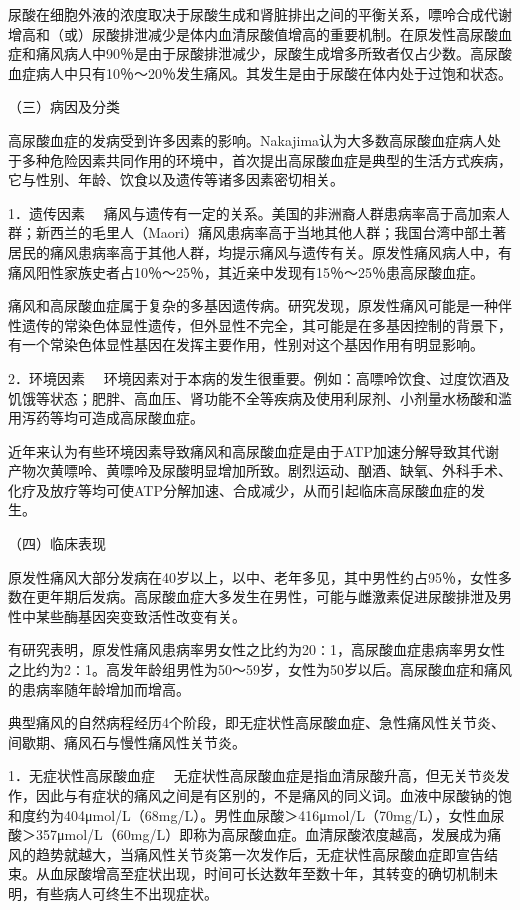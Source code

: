 尿酸在细胞外液的浓度取决于尿酸生成和肾脏排出之间的平衡关系，嘌呤合成代谢增高和（或）尿酸排泄减少是体内血清尿酸值增高的重要机制。在原发性高尿酸血症和痛风病人中90％是由于尿酸排泄减少，尿酸生成增多所致者仅占少数。高尿酸血症病人中只有10％～20％发生痛风。其发生是由于尿酸在体内处于过饱和状态。

（三）病因及分类

高尿酸血症的发病受到许多因素的影响。Nakajima认为大多数高尿酸血症病人处于多种危险因素共同作用的环境中，首次提出高尿酸血症是典型的生活方式疾病，它与性别、年龄、饮食以及遗传等诸多因素密切相关。

{1．遗传因素}
　痛风与遗传有一定的关系。美国的非洲裔人群患病率高于高加索人群；新西兰的毛里人（Maori）痛风患病率高于当地其他人群；我国台湾中部土著居民的痛风患病率高于其他人群，均提示痛风与遗传有关。原发性痛风病人中，有痛风阳性家族史者占10％～25％，其近亲中发现有15％～25％患高尿酸血症。

痛风和高尿酸血症属于复杂的多基因遗传病。研究发现，原发性痛风可能是一种伴性遗传的常染色体显性遗传，但外显性不完全，其可能是在多基因控制的背景下，有一个常染色体显性基因在发挥主要作用，性别对这个基因作用有明显影响。

{2．环境因素}
　环境因素对于本病的发生很重要。例如：高嘌呤饮食、过度饮酒及饥饿等状态；肥胖、高血压、肾功能不全等疾病及使用利尿剂、小剂量水杨酸和滥用泻药等均可造成高尿酸血症。

近年来认为有些环境因素导致痛风和高尿酸血症是由于ATP加速分解导致其代谢产物次黄嘌呤、黄嘌呤及尿酸明显增加所致。剧烈运动、酗酒、缺氧、外科手术、化疗及放疗等均可使ATP分解加速、合成减少，从而引起临床高尿酸血症的发生。

（四）临床表现

原发性痛风大部分发病在40岁以上，以中、老年多见，其中男性约占95％，女性多数在更年期后发病。高尿酸血症大多发生在男性，可能与雌激素促进尿酸排泄及男性中某些酶基因突变致活性改变有关。

有研究表明，原发性痛风患病率男女性之比约为20∶1，高尿酸血症患病率男女性之比约为2∶1。高发年龄组男性为50～59岁，女性为50岁以后。高尿酸血症和痛风的患病率随年龄增加而增高。

典型痛风的自然病程经历4个阶段，即无症状性高尿酸血症、急性痛风性关节炎、间歇期、痛风石与慢性痛风性关节炎。

{1．无症状性高尿酸血症}
　无症状性高尿酸血症是指血清尿酸升高，但无关节炎发作，因此与有症状的痛风之间是有区别的，不是痛风的同义词。血液中尿酸钠的饱和度约为404μmol/L（68mg/L）。男性血尿酸＞416μmol/L（70mg/L），女性血尿酸＞357μmol/L（60mg/L）即称为高尿酸血症。血清尿酸浓度越高，发展成为痛风的趋势就越大，当痛风性关节炎第一次发作后，无症状性高尿酸血症即宣告结束。从血尿酸增高至症状出现，时间可长达数年至数十年，其转变的确切机制未明，有些病人可终生不出现症状。

